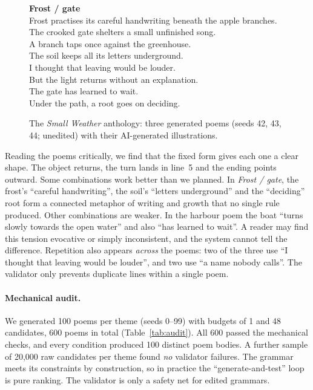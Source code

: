 \documentclass[letterpaper]{article}
\begin{document}
\begin{figure}[t]
\begin{minipage}[t]{0.32\textwidth}
\begin{minipage}{0.97\linewidth}
\textbf{Frost / gate}\\[2pt]
Frost practises its careful handwriting beneath the apple branches.\\
The crooked gate shelters a small unfinished song.\\[2pt]
A branch taps once against the greenhouse.\\
The soil keeps all its letters underground.\\[2pt]
I thought that leaving would be louder.\\
But the light returns without an explanation.\\[2pt]
The gate has learned to wait.\\
Under the path, a root goes on deciding.
\end{minipage}
\end{minipage}
\caption{The \emph{Small Weather} anthology: three generated poems
(seeds 42, 43, 44; unedited) with their AI-generated illustrations.}
\label{fig:anthology}
\end{figure}

Reading the poems critically, we find that the fixed form gives each
one a clear shape. The object returns, the turn lands in line~5 and the
ending points outward. Some combinations work better than we planned.
In \emph{Frost / gate}, the frost's ``careful handwriting'', the
soil's ``letters underground'' and the ``deciding'' root form a
connected metaphor of writing and growth that no single rule produced.
Other combinations are weaker. In the harbour poem the boat ``turns
slowly towards the open water'' and also ``has learned to wait''. A
reader may find this tension evocative or simply inconsistent, and the
system cannot tell the difference. Repetition also appears
\emph{across} the poems: two of the three use ``I thought that leaving
would be louder'', and two use ``a name nobody calls''. The validator
only prevents duplicate lines within a single poem.

\paragraph{Mechanical audit.}
We generated 100 poems per theme (seeds 0--99) with budgets of 1 and 48
candidates, 600 poems in total (Table~\ref{tab:audit}). All 600 passed
the mechanical checks, and every condition produced 100 distinct poem
bodies. A further sample of 20,000 raw candidates per theme found
\emph{no} validator failures. The grammar meets its constraints by
construction, so in practice the ``generate-and-test'' loop is pure
ranking. The validator is only a safety net for edited grammars.
\end{document}
